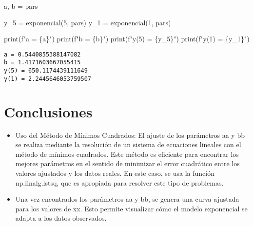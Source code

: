 \documentclass[
  letterpaper,
  DIV=11,
  numbers=noendperiod]{scrartcl}
\newenvironment{Shaded}{\begin{snugshade}}{\end{snugshade}}
\newcommand{\BuiltInTok}[1]{\textcolor[rgb]{0.00,0.23,0.31}{#1}}
\newcommand{\DecValTok}[1]{\textcolor[rgb]{0.68,0.00,0.00}{#1}}
\newcommand{\NormalTok}[1]{\textcolor[rgb]{0.00,0.23,0.31}{#1}}
\newcommand{\OperatorTok}[1]{\textcolor[rgb]{0.37,0.37,0.37}{#1}}
\newcommand{\SpecialCharTok}[1]{\textcolor[rgb]{0.37,0.37,0.37}{#1}}
\newcommand{\SpecialStringTok}[1]{\textcolor[rgb]{0.13,0.47,0.30}{#1}}
\providecommand{\tightlist}{%
  \setlength{\itemsep}{0pt}\setlength{\parskip}{0pt}}\usepackage{longtable,booktabs,array}
\begin{document}
\begin{Shaded}
\begin{Highlighting}[]
\NormalTok{a, b }\OperatorTok{=}\NormalTok{ pars}

\NormalTok{y\_5 }\OperatorTok{=}\NormalTok{ exponencial(}\DecValTok{5}\NormalTok{, pars)}
\NormalTok{y\_1 }\OperatorTok{=}\NormalTok{ exponencial(}\DecValTok{1}\NormalTok{, pars)}

\BuiltInTok{print}\NormalTok{(}\SpecialStringTok{f"a = }\SpecialCharTok{\{}\NormalTok{a}\SpecialCharTok{\}}\SpecialStringTok{"}\NormalTok{)}
\BuiltInTok{print}\NormalTok{(}\SpecialStringTok{f"b = }\SpecialCharTok{\{}\NormalTok{b}\SpecialCharTok{\}}\SpecialStringTok{"}\NormalTok{)}
\BuiltInTok{print}\NormalTok{(}\SpecialStringTok{f"y(5) = }\SpecialCharTok{\{}\NormalTok{y\_5}\SpecialCharTok{\}}\SpecialStringTok{"}\NormalTok{)}
\BuiltInTok{print}\NormalTok{(}\SpecialStringTok{f"y(1) = }\SpecialCharTok{\{}\NormalTok{y\_1}\SpecialCharTok{\}}\SpecialStringTok{"}\NormalTok{)}
\end{Highlighting}
\end{Shaded}

\begin{verbatim}
a = 0.5440855388147082
b = 1.4171603667055415
y(5) = 650.1174439111649
y(1) = 2.2445646053759507
\end{verbatim}

\section{Conclusiones}\label{conclusiones}

\begin{itemize}
\tightlist
\item
  Uso del Método de Mínimos Cuadrados: El ajuste de los parámetros aa y
  bb se realiza mediante la resolución de un sistema de ecuaciones
  lineales con el método de mínimos cuadrados. Este método es eficiente
  para encontrar los mejores parámetros en el sentido de minimizar el
  error cuadrático entre los valores ajustados y los datos reales. En
  este caso, se usa la función np.linalg.lstsq, que es apropiada para
  resolver este tipo de problemas.
\item
  Una vez encontrados los parámetros aa y bb, se genera una curva
  ajustada para los valores de xx. Esto permite visualizar cómo el
  modelo exponencial se adapta a los datos observados.
\end{itemize}
\end{document}

